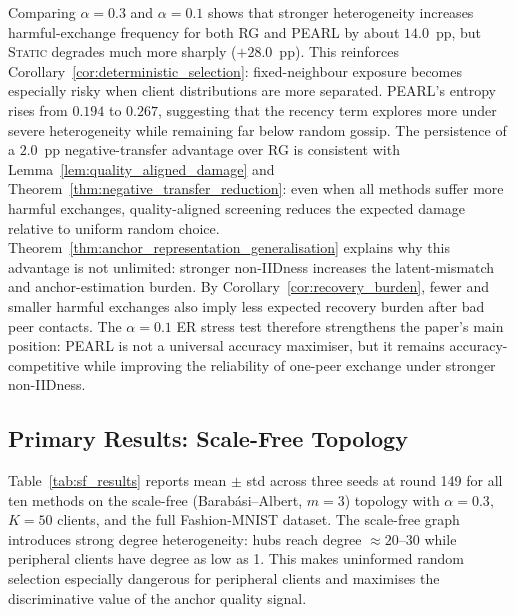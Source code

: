 \documentclass[conference]{IEEEtran}
\begin{document}
Comparing $\alpha=0.3$ and $\alpha=0.1$ shows that stronger heterogeneity increases harmful-exchange frequency for both \textsc{RG} and \textsc{PEARL} by about $14.0$~pp, but \textsc{Static} degrades much more sharply ($+28.0$~pp). This reinforces Corollary~\ref{cor:deterministic_selection}: fixed-neighbour exposure becomes especially risky when client distributions are more separated. \textsc{PEARL}'s entropy rises from $0.194$ to $0.267$, suggesting that the recency term explores more under severe heterogeneity while remaining far below random gossip. The persistence of a $2.0$~pp negative-transfer advantage over \textsc{RG} is consistent with Lemma~\ref{lem:quality_aligned_damage} and Theorem~\ref{thm:negative_transfer_reduction}: even when all methods suffer more harmful exchanges, quality-aligned screening reduces the expected damage relative to uniform random choice. Theorem~\ref{thm:anchor_representation_generalisation} explains why this advantage is not unlimited: stronger non-IIDness increases the latent-mismatch and anchor-estimation burden. By Corollary~\ref{cor:recovery_burden}, fewer and smaller harmful exchanges also imply less expected recovery burden after bad peer contacts. The $\alpha=0.1$ ER stress test therefore strengthens the paper's main position: PEARL is not a universal accuracy maximiser, but it remains accuracy-competitive while improving the reliability of one-peer exchange under stronger non-IIDness.

\subsection{Primary Results: Scale-Free Topology}
\label{subsec:results-sf}

Table~\ref{tab:sf_results} reports mean $\pm$ std across three seeds at round 149 for all ten methods on the scale-free (Barab\'{a}si--Albert, $m=3$) topology with $\alpha=0.3$, $K=50$ clients, and the full Fashion-MNIST dataset. The scale-free graph introduces strong degree heterogeneity: hubs reach degree $\approx20$--30 while peripheral clients have degree as low as 1. This makes uninformed random selection especially dangerous for peripheral clients and maximises the discriminative value of the anchor quality signal.
\end{document}
